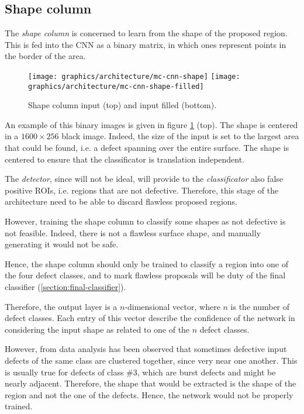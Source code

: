     \subsection{Shape column}\label{section:shape-column}
        \par{
            The \emph{shape column} is concerned to learn from the shape of the proposed region. This is fed into the CNN as a binary matrix, in which ones represent points in the border of the area.
        }
        \begin{figure}
            \centering
            \texttt{[image: graphics/architecture/mc-cnn-shape]}
            \vskip 0.05cm
            \texttt{[image: graphics/architecture/mc-cnn-shape-filled]}
            \caption{Shape column input (top) and input filled (bottom).}\label{fig:mc-cnn:shape-input}
        \end{figure}
        \par{
            An example of this binary images is given in figure \ref{fig:mc-cnn:shape-input} (top). The shape is centered in a $1600\times 256$ black image. Indeed, the size of the input is set to the largest area that could be found, i.e. a defect spanning over the entire surface. The shape is centered to ensure that the classificator is translation independent. 
        }
        \par{
            The \emph{detector}, since will not be ideal, will provide to the \emph{classificator} also false positive ROIs, i.e. regions that are not defective. Therefore, this stage of the architecture need to be able to discard flawless proposed regions.
        }
        \par{
            However, training the shape column to classify some shapes as not defective is not feasible. Indeed, there is not a flawless surface shape, and manually generating it would not be safe.
        }
        \par{
            Hence, the shape column should only be trained to classify a region into one of the four defect classes, and to mark flawless proposals will be duty of the final classifier (\ref{section:final-classifier}).
        }
        \par{
            Therefore, the output layer is a $n$-dimensional vector, where $n$ is the number of defect classes. Each entry of this vector describe the confidence of the network in considering the input shape as related to one of the $n$ defect classes.
        }
        \par{
            However, from data analysis has been observed that sometimes defective input defects of the same class are clustered together, since very near one another. This is usually true for defects of class \#3, which are burst defects and might be nearly adjacent. Therefore, the shape that would be extracted is the shape of the region and not the one of the defects. Hence, the network would not be properly trained.
        }
